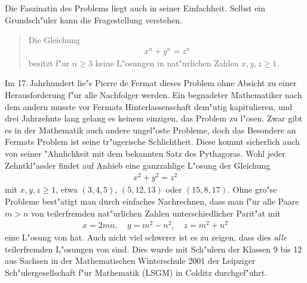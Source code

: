 \documentclass[11pt]{article}
\begin{document}
Die Faszinatin des Problems liegt auch in seiner Einfachheit. Selbst ein
Grundsch"uler kann die Fragestellung verstehen.
\begin{quote}
Die Gleichung
\begin{align}\label{f}
x^n+y^n=z^n
\end{align}
besitzt f"ur $n\ge 3$ keine L"osungen in nat"urlichen Zahlen
$x,y,z\ge 1$.
\end{quote}
Im 17.\,Jahrhundert lie"s Pierre de Fermat dieses Problem ohne Absicht
zu einer Herausforderung f"ur alle Nachfolger werden. Ein begnadeter Mathematiker
nach dem andern musste vor Fermats Hinterlassenschaft dem"utig kapitulieren,
und drei Jahrzehnte lang gelang es keinem einzigen, das Problem zu l"osen.
Zwar gibt es in der Mathematik auch andere ungel"oste Probleme,
doch das Besondere an Fermats Problem ist seine tr"ugerische Schlichtheit.
Diese kommt sicherlich auch von seiner "Ahnlichkeit mit dem bekannten 
Satz des Pythagoras. Wohl jeder  Zehntkl"assler findet auf Anhieb
eine ganzzahlige L"osung der Gleichung
\begin{align}\label{p}
x^2+y^2=z^2
\end{align}
mit $x,y,z\ge 1$, etwa $(3,4,5)$, $(5,12,13)$ oder $(15,8,17)$.
 Ohne gro"se Probleme best"atigt man durch einfaches Nachrechnen, 
dass man f"ur alle Paare $m>n$ von teilerfremden nat"urlichen Zahlen unterschiedlicher Parit"at  mit
\begin{align*}
x=2mn,\quad y=m^2-n^2,\quad z=m^2+n^2
\end{align*}
eine L"osung von \rf[p] hat. Auch nicht viel schwerer ist es zu zeigen,
dass dies {\em alle} teilerfremden L"osungen von \rf[p] sind.
Dies wurde mit Sch"ulern der Klassen 9 bis 12 aus Sachsen in der Mathematischen
Winterschule 2001 der Leipziger Sch"ulergesellschaft f"ur Mathematik (LSGM) 
in Colditz durchgef"uhrt.
\end{document}

